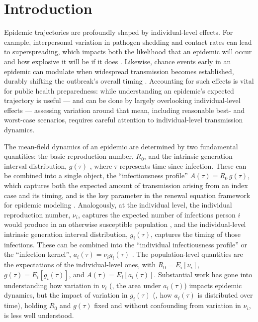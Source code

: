 \clearpage

\section{Introduction}

Epidemic trajectories are profoundly shaped by individual-level effects. For example, interpersonal variation in pathogen shedding and contact rates can lead to superspreading, which impacts both the likelihood that an epidemic will occur and how explosive it will be if it does \citep{lloyd-smith_superspreading_2005}. Likewise, chance events early in an epidemic can modulate when widespread transmission becomes established, durably shifting the outbreak's overall timing \citep{morris_computation_2024}. Accounting for such effects is vital for public health preparedness: while understanding an epidemic's expected trajectory is useful --- and can be done by largely overlooking individual-level effects --- assessing variation around that mean, including reasonable best- and worst-case scenarios, requires careful attention to individual-level transmission dynamics. 

The mean-field dynamics of an epidemic are determined by two fundamental quantities: the basic reproduction number, $R_0$, and the intrinsic generation interval distribution, $g(\tau)$ \citep{wallinga_how_2007}, where $\tau$ represents time since infection. These can be combined into a single object, the ``infectiousness profile'' $A(\tau) = R_0\,g(\tau)$, which captures both the expected amount of transmission arising from an index case and its timing, and is the key parameter in the renewal equation framework for epidemic modeling \citep{breda_formulation_2012}. Analogously, at the individual level, the individual reproduction number, $\nu_i$, captures the expected number of infections person $i$ would produce in an otherwise susceptible population \citep{lloyd-smith_superspreading_2005}, and the individual-level intrinsic generation interval distribution, $g_i(\tau)$, captures the timing of those infections. These can be combined into the ``individual infectiousness profile'' or the ``infection kernel'', $a_i(\tau) = \nu_i g_i(\tau)$ \citep{champredon_intrinsic_2015, svensson_note_2007}. The population-level quantities are the expectations of the individual-level ones, with $R_0 = E_i[\nu_i]$, $g(\tau) = E_i[g_i(\tau)]$, and $A(\tau) = E_i[a_i(\tau)]$. Substantial work has gone into understanding how variation in $\nu_i$ (\ie, the area under $a_i(\tau)$) impacts epidemic dynamics, but the impact of variation in $g_i(\tau)$ (\ie, how $a_i(\tau)$ is distributed over time), holding $R_0$ and $g(\tau)$ fixed and without confounding from variation in $\nu_i$, is less well understood. 

